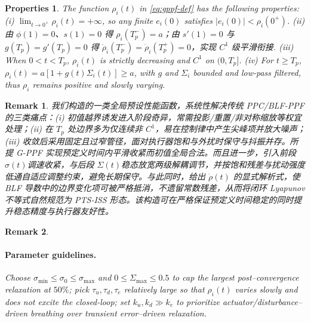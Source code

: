 \documentclass[pdflatex,sn-mathphys-num]{sn-jnl}%
\theoremstyle{thmstyleone}%
\theoremstyle{thmstyletwo}%
\newtheorem{remark}{Remark}%
\newtheorem{properties}{Properties}%
\theoremstyle{thmstylethree}%
\begin{document}
\begin{properties}

The function $\rho_i(t)$ in \eqref{eq:gppf-def} has the following properties:
(\emph{i}) $\displaystyle\lim_{t\to0^+}\rho_i(t)=+\infty$, so any finite $e_i(0)$ satisfies $|e_i(0)|<\rho_i(0^+)$. (\emph{ii}) 由 $\phi(1)=0$、$s(1)=0$ 得 $\rho_i(T_p^-)=a$；由 $s'(1)=0$ 与 $g(T_p)=g'(T_p)=0$ 得 $\dot\rho_i(T_p^-)=\dot\rho_i(T_p^+)=0$，实现 $C^1$ 级平滑衔接.
(\emph{iii}) When $0<t<T_p$, $\rho_i(t)$ is strictly decreasing and $C^1$ on $(0,T_p]$.
(\emph{iv}) For $t\ge T_p$, $\rho_i(t)=a[1+g(t)\Sigma_i(t)]\ge a$, with $g$ and $\Sigma_i$ bounded and low-pass filtered, thus $\rho_i$ remains positive and slowly varying.

\end{properties}

\begin{remark}
	我们构造的一类全局预设性能函数，系统性解决传统 PPC/BLF-PPF 的三类痛点：(\emph{i}) 初值越界诱发进入阶段奇异，常需投影/重置/非对称缩放等权宜处理；(\emph{ii}) 在 $T_p$ 处边界多为仅连续非 $C^1$，易在控制律中产生尖峰项并放大噪声；(\emph{iii}) 收敛后采用固定且过窄管径，面对执行器饱和与外扰时保守与抖振并存。所提 G-PPF 实现预定义时间内平滑收紧而初值全局合法。而且进一步，引入前段$\sigma(t)$调速收紧，与后段 $\Sigma(t)$稳态放宽两级解耦调节，并按饱和残差与扰动强度低通自适应调整约束，避免长期保守。与此同时，给出 $\dot\rho(t)$ 的显式解析式，使 BLF 导数中的边界变化项可被严格抵消，不遗留常数残差，从而将闭环 Lyapunov 不等式自然规范为 PTS-ISS 形态。该构造可在严格保证预定义时间稳定的同时提升稳态精度与执行器友好性。

\end{remark}
\begin{remark}
\paragraph{Parameter guidelines.}
Choose $\sigma_{\min}\le\sigma_{0}\le\sigma_{\max}$ and $0\le\Sigma_{\max}\le 0.5$ to cap the largest post–convergence relaxation at $50\%$; pick $\tau_u,\tau_d,\tau_e$ relatively large so that $\rho_i(t)$ varies slowly and does not excite the closed-loop; set $k_u,k_d\gg k_e$ to prioritize actuator/disturbance–driven breathing over transient error–driven relaxation.%
\end{remark}
	
\end{document}
